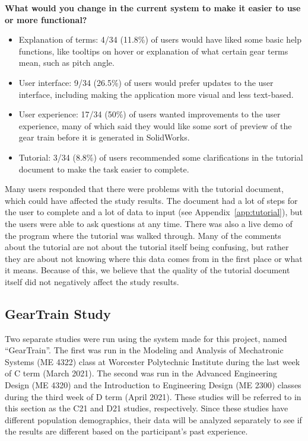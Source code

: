 \begin{doublespace}
\begin{singlespace}
\textbf{What would you change in the current system to make it easier to use or more functional?}
\begin{itemize}
    \item Explanation of terms: 4/34 (11.8\%) of users would have liked some basic help functions, like tooltips on hover or explanation of what certain gear terms mean, such as pitch angle.
    \item User interface: 9/34 (26.5\%) of users would prefer updates to the user interface, including making the application more visual and less text-based.
    \item User experience: 17/34 (50\%) of users wanted improvements to the user experience, many of which said they would like some sort of preview of the gear train before it is generated in SolidWorks.
    \item Tutorial: 3/34 (8.8\%) of users recommended some clarifications in the tutorial document to make the task easier to complete.
\end{itemize}

\end{singlespace}

Many users responded that there were problems with the tutorial document, which could have affected the study results. The document had a lot of steps for the user to complete and a lot of data to input (see Appendix~\ref{app:tutorial}), but the users were able to ask questions at any time. There was also a live demo of the program where the tutorial was walked through. Many of the comments about the tutorial are not about the tutorial itself being confusing, but rather they are about not knowing where this data comes from in the first place or what it means. Because of this, we believe that the quality of the tutorial document itself did not negatively affect the study results.

\subsection{GearTrain Study}

Two separate studies were run using the system made for this project, named ``GearTrain''. The first was run in the Modeling and Analysis of Mechatronic Systems (ME 4322) class at Worcester Polytechnic Institute during the last week of C term (March 2021). The second was run in the Advanced Engineering Design (ME 4320) and the Introduction to Engineering Design (ME 2300) classes during the third week of D term (April 2021). These studies will be referred to in this section as the C21 and D21 studies, respectively. Since these studies have different population demographics, their data will be analyzed separately to see if the results are different based on the participant's past experience.


\end{doublespace}
